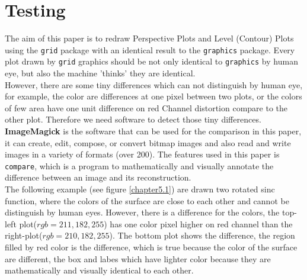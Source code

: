 \documentclass[paper=a4, fontsize=11pt]{report}
\begin{document}
\chapter{Testing}
The aim of this paper is to redraw Perspective Plots and Level (Contour) Plots using the \texttt{grid} package with an identical result to the \texttt{graphics} package. Every plot drawn by \texttt{grid} graphics should be not only identical to \texttt{graphics} by human eye, but also the machine 'thinks' they are identical.\\

However, there are some tiny differences which can not distinguish by human eye, for example, the color are differences at one pixel between two plots, or the colors of few area have one unit difference on red Channel distortion compare to the other plot. Therefore we need software to detect those tiny differences.\\

\textbf{ImageMagick} is the software that can be used for the comparison in this paper, it can create, edit, compose, or convert bitmap images and also read and write images in a variety of formats (over 200). The features used in this paper is \texttt{compare}, which is a program to mathematically and visually annotate the difference between an image and its reconstruction.\\

The following example (see figure \ref{chapter5.1}) are drawn two rotated sinc function, where the colors of the surface are close to each other and cannot be distinguish by human eyes. However, there is a difference for the colors, the top-left plot($rgb = 211, 182, 255$) has one color pixel higher on red channel than the right-plot($rgb = 210, 182, 255$). The bottom plot shows the difference, the region filled by red color is the difference, which is true because the color of the surface are different, the box and labes which have lighter color because they are mathematically and visually identical to each other. \\
\end{document}
